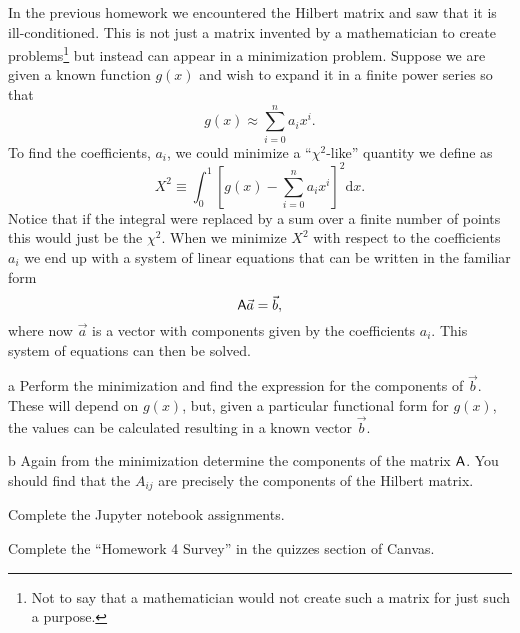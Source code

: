 \documentclass[]{homework}
\begin{document}


\begin{problem}{1}

  In the previous homework we encountered the Hilbert matrix and saw that it is ill-conditioned.
  This is not just a matrix invented by a mathematician to create problems\footnote{Not to say that a mathematician would not create such a matrix for just such a purpose.} but instead can appear
  in a minimization problem.
  Suppose we are given a known function $g(x)$ and wish to expand it in a finite power series so that
  \[ g(x) \approx \sum_{i=0}^n a_i x^i. \]
  To find the coefficients, $a_i$, we could minimize a ``$\chi^2$-like'' quantity we define as
  \[ X^2 \equiv \int_0^1 \left[ g(x) - \sum_{i=0}^n a_i x^i \right]^2 \mathrm{d} x. \]
  Notice that if the integral were replaced by a sum over a finite number of points this would just be the $\chi^2$.
  When we minimize $X^2$ with respect to the coefficients $a_i$ we end up with a system of linear equations that can be written in the familiar form
  \[ \textsf A \vec a = \vec b, \]
  where now $\vec a$ is a vector with components given by the coefficients $a_i$.
  This system of equations can then be solved.
  \begin{subproblem}{a}
    Perform the minimization and find the expression for the
    components of $\vec b$.  These will depend on $g(x)$, but, given a
    particular functional form for $g(x)$, the values can be
    calculated resulting in a known vector $\vec b$.
  \end{subproblem}
  \begin{subproblem}{b}
    Again from the minimization determine the components of the matrix
    $\textsf A$.  You should find that the $A_{ij}$ are precisely the
    components of the Hilbert matrix. 
  \end{subproblem}

\end{problem}



\begin{problem}{2}
  Complete the Jupyter notebook assignments.
\end{problem}


\begin{problem}{3}
  Complete the ``Homework 4 Survey'' in the quizzes section of Canvas.
\end{problem}
\end{document}
